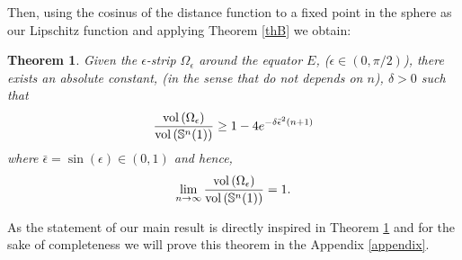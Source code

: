\documentclass{amsart}
\newtheorem{theorem}{Theorem}[section]
\theoremstyle{definition}
\theoremstyle{remark}
\begin{document}
Then, using the cosinus of the distance function to a fixed point in the sphere as our Lipschitz function and applying Theorem \ref{thB} we obtain:

\begin{theorem}\label{teo:mitjana}
 Given the $\epsilon$-strip $\Omega_\epsilon$ around the equator $E$, ($\epsilon \in (0,\pi/2)$),  there exists an absolute constant, (in the sense that do not depends on $n$), $\delta>0$ such that
\begin{equation}\label{eq3}
\frac{{\rm vol}\left(\Omega_\epsilon\right)}{{\rm vol}\left(\mathbb{S}^n(1)\right)}\geq 1-4e^{-\delta\bar\epsilon^2(n+1)}
\end{equation}
 where $\bar\epsilon=\sin(\epsilon) \in (0,1)$ and hence,
 \begin{equation}\label{eq3.1}
\lim_{n\to \infty}\frac{{\rm vol}\left(\Omega_\epsilon\right)}{{\rm vol}\left(\mathbb{S}^n(1)\right)}=1.
\end{equation}   
\end{theorem}

 As  the statement of our main result is directly inspired in Theorem \ref{teo:mitjana} and for the sake of completeness we will prove this theorem in the Appendix \ref{appendix}.
\end{document}
